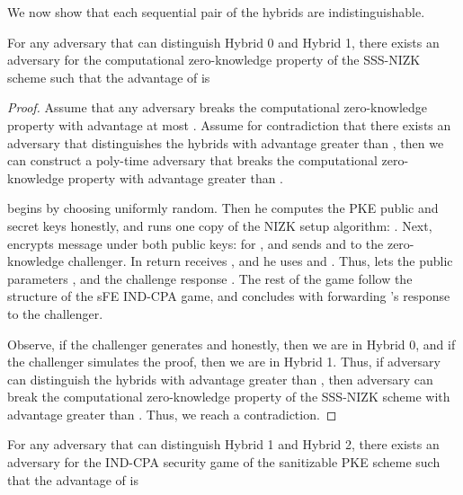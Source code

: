 \documentclass{llncs}
\begin{document}
We  now show that each sequential pair of the hybrids are indistinguishable.


\begin{claim} \label{claim:sFE_IND-CPA_ZK_1}
For any adversary  that can distinguish Hybrid 0 and Hybrid 1, there exists an adversary  for the computational zero-knowledge property of the SSS-NIZK scheme such that the advantage of  is
	
\end{claim}



\begin{proof}
Assume that any adversary breaks the computational zero-knowledge property with advantage at most .
Assume for contradiction that there exists an adversary  that distinguishes the hybrids with advantage greater than , then we can construct a poly-time adversary  that breaks the computational zero-knowledge property with advantage greater than . 

 begins by choosing  uniformly random. Then he computes the PKE public and secret keys honestly, and runs one copy of the NIZK setup algorithm: . Next,  encrypts message  under both public keys:  for , and sends  and  to the zero-knowledge challenger. In return  receives , and he uses  and . Thus,  lets the public parameters , and the challenge response . 
The rest of the game follow the structure of the sFE IND-CPA game, and concludes with  forwarding 's response  to the challenger. 

Observe, if the challenger generates  and  honestly, then we are in Hybrid 0, and if the challenger simulates the proof, then we are in Hybrid 1. Thus, if adversary  can distinguish the hybrids with advantage greater than , then adversary  can break the computational zero-knowledge property of the SSS-NIZK scheme with advantage greater than . Thus, we reach a contradiction.
\end{proof}

\begin{claim} \label{claim:sFE_IND-CPA_PKE_1}
For any adversary  that can distinguish Hybrid 1 and Hybrid 2, there exists an adversary  for the IND-CPA security game of the sanitizable PKE scheme such that the advantage of  is
	
\end{claim}
\end{document}
